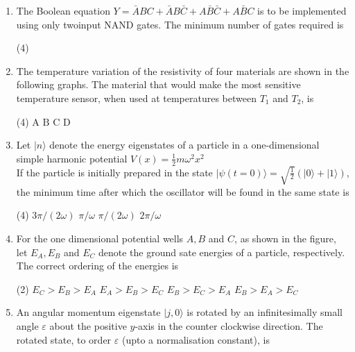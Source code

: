 \begin{enumerate}
 \begin{tasks}(4)
\end{tasks}
\item The Boolean equation $Y=\bar{A} B C+\bar{A} B \bar{C}+A \bar{B} \bar{C}+A \bar{B} C$ is to be implemented using only twoinput NAND gates. The minimum number of gates required is
 \begin{tasks}(4)
\end{tasks}
\item  The temperature variation of the resistivity of four materials are shown in the following graphs.	
The material that would make the most sensitive temperature sensor, when used at temperatures between $T_{1}$ and $T_{2}$, is
 \begin{tasks}(4)
	\task[\textbf{a.}]$\mathrm{A}$
	\task[\textbf{b.}]$\mathrm{B}$
	\task[\textbf{c.}]$\mathrm{C}$
	\task[\textbf{d.}] D
\end{tasks}	
\item  Let $|n\rangle$ denote the energy eigenstates of a particle in a one-dimensional simple harmonic potential $V(x)=\frac{1}{2} m \omega^{2} x^{2}$\\
If the particle is initially prepared in the state $|\psi(t=0)\rangle=\sqrt{\frac{1}{2}}(|0\rangle+|1\rangle)$, the minimum time after which the oscillator will be found in the same state is
 \begin{tasks}(4)
	\task[\textbf{a.}]$3 \pi /(2 \omega)$
	\task[\textbf{b.}]$\pi / \omega$
	\task[\textbf{c.}]$\pi /(2 \omega)$
	\task[\textbf{d.}] $2 \pi / \omega$
\end{tasks}
\item  For the one dimensional potential wells $A, B$ and $C$, as shown in the figure, let $E_{A}, E_{B}$ and $E_{C}$ denote the ground sate energies of a particle, respectively.	
The correct ordering of the energies is
 \begin{tasks}(2)
	\task[\textbf{a.}] $E_{C}>E_{B}>E_{A}$
	\task[\textbf{b.}]$E_{A}>E_{B}>E_{C}$
	\task[\textbf{c.}]$E_{B}>E_{C}>E_{A}$
	\task[\textbf{d.}] $E_{B}>E_{A}>E_{C}$
\end{tasks}
\item  An angular momentum eigenstate $|j, 0\rangle$ is rotated by an infinitesimally small angle $\varepsilon$ about the positive $y$-axis in the counter clockwise direction. The rotated state, to order $\varepsilon$ (upto a normalisation constant), is

\end{enumerate}
